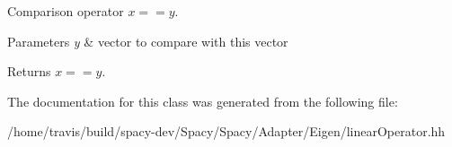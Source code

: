 Comparison operator $ x==y$. 


\begin{DoxyParams}{Parameters}
{\em y} & vector to compare with this vector \\
\hline
\end{DoxyParams}
\begin{DoxyReturn}{Returns}
$ x==y$. 
\end{DoxyReturn}


The documentation for this class was generated from the following file\-:\begin{DoxyCompactItemize}
\item 
/home/travis/build/spacy-\/dev/\-Spacy/\-Spacy/\-Adapter/\-Eigen/linear\-Operator.\-hh\end{DoxyCompactItemize}
